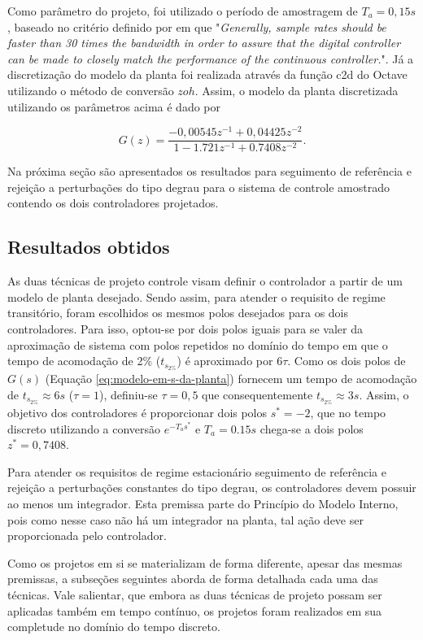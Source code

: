 Como parâmetro do projeto, foi utilizado o período de amostragem de $T_{a} =
0,15 s$, baseado no critério definido por \cite[p. 61]{Franklin1997} em que
"\textit{Generally, sample rates should be faster than 30 times the bandwidth in
order to assure that the digital controller can be made to closely match the
performance of the continuous controller.}". Já a discretização do modelo da
planta foi realizada através da função c2d do Octave utilizando o método de
conversão $zoh$. Assim, o modelo da planta discretizada utilizando os parâmetros
acima é dado por

\begin{equation}
    \label{eq:modelo-em-z-da-planta}
    G(z) = \frac{-0,00545z^{-1} + 0,04425z^{-2}}{1 - 1.721z^{-1} + 0.7408z^{-2}}.
\end{equation}

Na próxima seção são apresentados os resultados para seguimento de referência e
rejeição a perturbações do tipo degrau para o sistema de controle amostrado
contendo os dois controladores projetados.

\subsection{Resultados obtidos}
As duas técnicas de projeto controle visam definir o controlador a partir de um
modelo de planta desejado. Sendo assim, para atender o requisito de regime
transitório, foram escolhidos os mesmos polos desejados para os dois
controladores. Para isso, optou-se por dois polos iguais para se valer da
aproximação de sistema com polos repetidos no domínio do tempo em que o tempo de
acomodação de 2\% ($t_{s_{2\%}}$) é aproximado por $6\tau$. Como os dois polos
de $G(s)$ (Equação \ref{eq:modelo-em-s-da-planta}) fornecem um tempo de
acomodação de $t_{s_{2\%}}\approx 6s$ ($\tau = 1$), definiu-se $\tau = 0,5$ que
consequentemente $t_{s_{2\%}}\approx 3s$. Assim, o objetivo dos
controladores é proporcionar dois polos $s^*=-2$, que no tempo discreto
utilizando a conversão $e^{-T_{a}s^*}$ e $T_{a} = 0.15s$ chega-se a dois polos
$z^*=0,7408$.

Para atender os requisitos de regime estacionário seguimento de referência e
rejeição a perturbações constantes do tipo degrau, os controladores devem
possuir ao menos um integrador. Esta premissa parte do Princípio do Modelo
Interno, pois como nesse caso não há um integrador na planta, tal ação deve ser
proporcionada pelo controlador.

Como os projetos em si se materializam de forma diferente, apesar das mesmas
premissas, a subseções seguintes aborda de forma detalhada cada uma das
técnicas. Vale salientar, que embora as duas técnicas de projeto possam ser
aplicadas também em tempo contínuo, os projetos foram realizados em sua
completude no domínio do tempo discreto.

